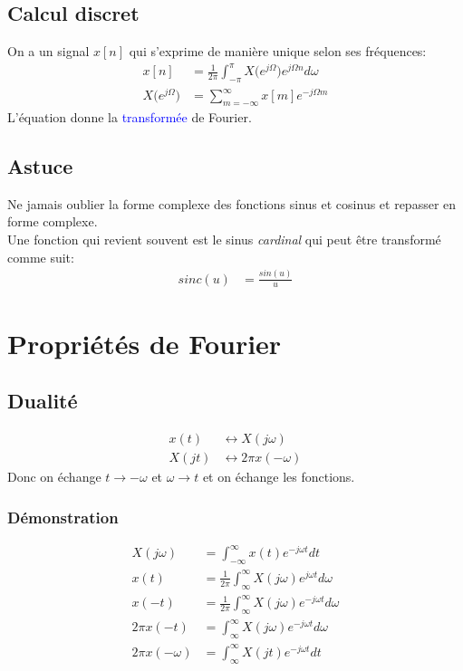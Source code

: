 \documentclass{report}
\begin{document}
\subsection{Calcul discret}
On a un signal $x[n]$ qui s'exprime de manière unique selon ses fréquences:
\begin{align}
x[n] &= \frac{1}{2\pi}\int_{-\pi}^{\pi} X \bigl(e^{j\Omega} \bigl) e^{j\Omega n} d\omega\\
X\bigl(e^{j\Omega} \bigl) &= \sum_{m=-\infty}^{\infty} x[m]e^{-j\Omega m} \label{eq:transfoDF}
\end{align}
L'équation \label{eq:transfoDF} donne la \textcolor{blue}{transformée} de Fourier.

\subsection{Astuce}
Ne jamais oublier la forme complexe des fonctions sinus et cosinus et repasser en forme complexe.\\
Une fonction qui revient souvent est le sinus \textit{cardinal} qui peut être transformé comme suit:
\begin{align*}
sinc(u) &= \frac{sin( u)}{ u}
\end{align*}

\section{Propriétés de Fourier} \label{proprF}

\subsection{Dualité} \label{Dua}
\begin{align*}
x(t) & \longleftrightarrow X(j\omega)\\
X(jt) & \longleftrightarrow 2\pi x(-\omega)
\end{align*}
Donc on échange $t \rightarrow -\omega$ et $\omega \rightarrow t$ et on échange les fonctions.
\subsubsection{Démonstration}
\begin{align*}
X(j \omega) &= \int_{-\infty}^{\infty} x(t) e^{-j\omega t} dt\\
x(t) &= \frac{1}{2\pi} \int_{\infty}^{\infty} X(j\omega) e^{j\omega t} d\omega\\
x(-t) &= \frac{1}{2\pi} \int_{\infty}^{\infty} X(j\omega) e^{-j\omega t} d\omega\\
2 \pi x(-t) &= \int_{\infty}^{\infty} X(j\omega) e^{-j\omega t} d\omega\\
2 \pi x(-\omega) &= \int_{\infty}^{\infty} X(jt) e^{-j\omega t} dt
\end{align*}
\end{document}
